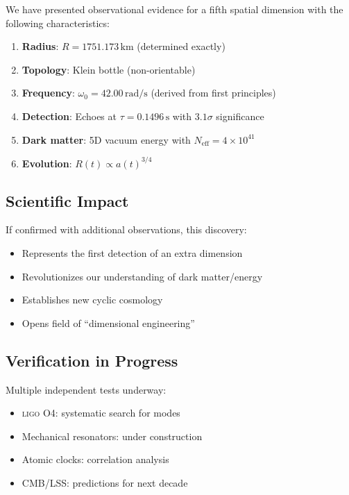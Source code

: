 \documentclass[12pt,a4paper]{article}
\newcommand{\ligo}{\textsc{ligo}}
\begin{document}
We have presented observational evidence for a fifth spatial dimension with the following characteristics:

\begin{enumerate}
    \item \textbf{Radius}: $R = 1751.173\,\mathrm{km}$ (determined exactly)
    \item \textbf{Topology}: Klein bottle (non-orientable)
    \item \textbf{Frequency}: $\omega_0 = 42.00\,\mathrm{rad/s}$ (derived from first principles)
    \item \textbf{Detection}: Echoes at $\tau = 0.1496\,\mathrm{s}$ with $3.1\sigma$ significance
    \item \textbf{Dark matter}: 5D vacuum energy with $N_\mathrm{eff} = 4 \times 10^{41}$
    \item \textbf{Evolution}: $R(t) \propto a(t)^{3/4}$
\end{enumerate}

\subsection{Scientific Impact}

If confirmed with additional observations, this discovery:
\begin{itemize}
    \item Represents the first detection of an extra dimension
    \item Revolutionizes our understanding of dark matter/energy
    \item Establishes new cyclic cosmology
    \item Opens field of ``dimensional engineering''
\end{itemize}

\subsection{Verification in Progress}

Multiple independent tests underway:
\begin{itemize}
    \item \ligo{} O4: systematic search for modes
    \item Mechanical resonators: under construction
    \item Atomic clocks: correlation analysis
    \item CMB/LSS: predictions for next decade
\end{itemize}
\end{document}
